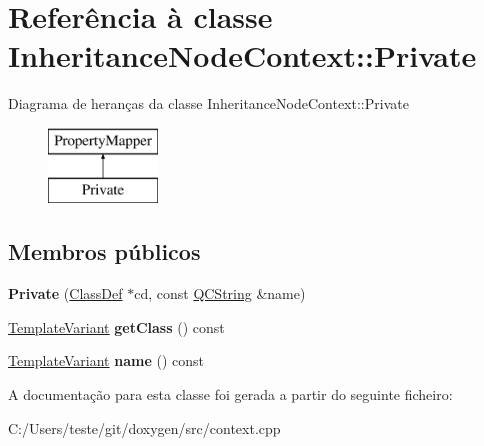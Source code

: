 \hypertarget{class_inheritance_node_context_1_1_private}{\section{Referência à classe Inheritance\-Node\-Context\-:\-:Private}
\label{class_inheritance_node_context_1_1_private}
}
Diagrama de heranças da classe Inheritance\-Node\-Context\-:\-:Private\begin{figure}[H]
\begin{center}
\leavevmode
\includegraphics[height=2.000000cm]{class_inheritance_node_context_1_1_private}
\end{center}
\end{figure}
\subsection*{Membros públicos}
\begin{DoxyCompactItemize}
\item 
\hypertarget{class_inheritance_node_context_1_1_private_a998d8b7ec521398d88720946fb5d39c6}{{\bfseries Private} (\hyperlink{class_class_def}{Class\-Def} $\ast$cd, const \hyperlink{class_q_c_string}{Q\-C\-String} \&name)}\label{class_inheritance_node_context_1_1_private_a998d8b7ec521398d88720946fb5d39c6}

\item 
\hypertarget{class_inheritance_node_context_1_1_private_abb8d0e1899ad3cd8458a1f592045493d}{\hyperlink{class_template_variant}{Template\-Variant} {\bfseries get\-Class} () const }\label{class_inheritance_node_context_1_1_private_abb8d0e1899ad3cd8458a1f592045493d}

\item 
\hypertarget{class_inheritance_node_context_1_1_private_af98912d3b2af14adadc5c221338ec7e9}{\hyperlink{class_template_variant}{Template\-Variant} {\bfseries name} () const }\label{class_inheritance_node_context_1_1_private_af98912d3b2af14adadc5c221338ec7e9}

\end{DoxyCompactItemize}


A documentação para esta classe foi gerada a partir do seguinte ficheiro\-:\begin{DoxyCompactItemize}
\item 
C\-:/\-Users/teste/git/doxygen/src/context.\-cpp\end{DoxyCompactItemize}
